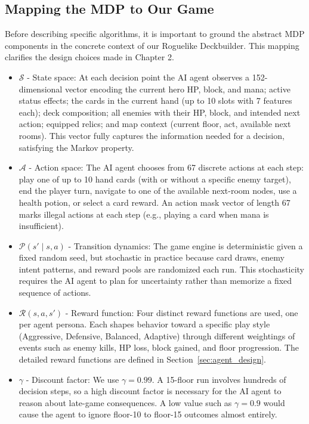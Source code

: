 \subsection{Mapping the MDP to Our Game}

Before describing specific algorithms, it is important to ground the abstract MDP components in the concrete context of our Roguelike Deckbuilder. This mapping clarifies the design choices made in Chapter 2.

\begin{itemize}
    \item $\mathcal{S}$ - State space: At each decision point the AI agent observes a 152-dimensional vector encoding the current hero HP, block, and mana; active status effects; the cards in the current hand (up to 10 slots with 7 features each); deck composition; all enemies with their HP, block, and intended next action; equipped relics; and map context (current floor, act, available next rooms). This vector fully captures the information needed for a decision, satisfying the Markov property.
    \item $\mathcal{A}$ - Action space: The AI agent chooses from 67 discrete actions at each step: play one of up to 10 hand cards (with or without a specific enemy target), end the player turn, navigate to one of the available next-room nodes, use a health potion, or select a card reward. An action mask vector of length 67 marks illegal actions at each step (e.g., playing a card when mana is insufficient).
    \item $\mathcal{P}(s' \mid s, a)$ - Transition dynamics: The game engine is deterministic given a fixed random seed, but stochastic in practice because card draws, enemy intent patterns, and reward pools are randomized each run. This stochasticity requires the AI agent to plan for uncertainty rather than memorize a fixed sequence of actions.
    \item $\mathcal{R}(s, a, s')$ - Reward function: Four distinct reward functions are used, one per agent persona. Each shapes behavior toward a specific play style (Aggressive, Defensive, Balanced, Adaptive) through different weightings of events such as enemy kills, HP loss, block gained, and floor progression. The detailed reward functions are defined in Section~\ref{sec:agent_design}.
    \item $\gamma$ - Discount factor: We use $\gamma = 0.99$. A 15-floor run involves hundreds of decision steps, so a high discount factor is necessary for the AI agent to reason about late-game consequences. A low value such as $\gamma = 0.9$ would cause the agent to ignore floor-10 to floor-15 outcomes almost entirely.
\end{itemize}


